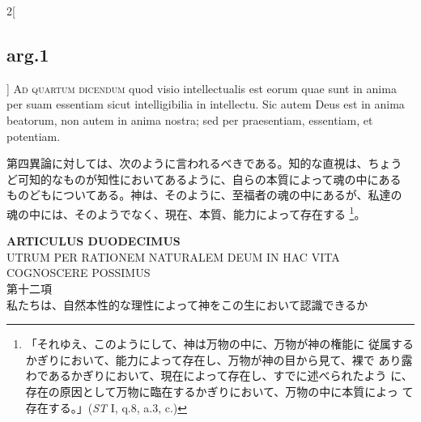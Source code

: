 \documentclass[paper=a4paper,fontsize=10pt,jafontsize=9pt,titlepage]{jlreq}
\begin{document}
\begin{paracol}{2}[\subsection{arg.1}]
{\scshape Ad quartum dicendum} quod visio intellectualis est eorum quae
sunt in anima per suam essentiam sicut intelligibilia in
intellectu. Sic autem Deus est in anima beatorum, non autem in anima
nostra; sed per praesentiam, essentiam, et potentiam.

\switchcolumn

第四異論に対しては、次のように言われるべきである。知的な直視は、ちょう
ど可知的なものが知性においてあるように、自らの本質によって魂の中にある
ものどもについてある。神は、そのように、至福者の魂の中にあるが、私達の
魂の中には、そのようでなく、現在、本質、能力によって存在する
\footnote{「それゆえ、このようにして、神は万物の中に、万物が神の権能に
従属するかぎりにおいて、能力によって存在し、万物が神の目から見て、裸で
あり露わであるかぎりにおいて、現在によって存在し、すでに述べられたよう
に、存在の原因として万物に臨在するかぎりにおいて、万物の中に本質によっ
て存在する。」({\itshape ST} I, q.8, a.3, c.)}。

\end{paracol}

\newpage
{}

\begin{center}
 {\Large {\bfseries ARTICULUS DUODECIMUS}}\\
{\large UTRUM PER RATIONEM NATURALEM DEUM IN HAC VITA\\COGNOSCERE POSSIMUS}\\
{\large 第十二項\\私たちは、自然本性的な理性によって神をこの生において認識できるか}

\end{center}

{}
\setcounter{section}{12}
\setcounter{subsection}{0}
\end{document}
